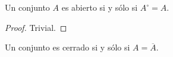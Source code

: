 


\begin{proposition}
Un conjunto $A$ es abierto si y sólo si $A^\circ = A$.
\end{proposition}
\begin{proof}
Trivial.
\end{proof}

\begin{proposition}
Un conjunto es cerrado si y sólo si $A = \overline{A}$.
\end{proposition}

